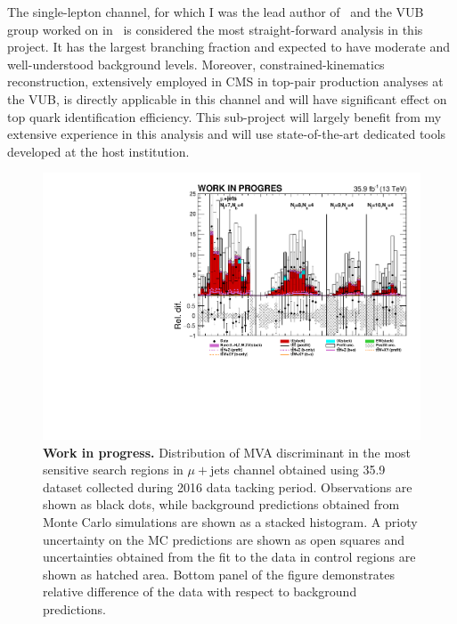 \textcolor{\mynew}{The single-lepton channel, for which I was the lead author of~\cite{CMS:2016wig} and the VUB group worked on in~\cite{Beck:2016hyi,Khachatryan:2014sca} is considered the most straight-forward analysis in this project. It has the largest branching fraction and expected to have moderate and well-understood background levels. Moreover, constrained-kinematics reconstruction, extensively employed in CMS in top-pair production analyses at the VUB, is directly applicable in this channel and will have significant effect on top quark identification efficiency. This sub-project will largely benefit from my extensive experience in this analysis and will use state-of-the-art dedicated tools developed at the host institution. \begin{figure}
\centering
\includegraphics[width=\linewidth]{figures/mu}
\caption{\textbf{Work in progress.} Distribution of MVA discriminant in the most sensitive search regions in $\mu+$jets channel obtained using 35.9 \invfb dataset collected during 2016 data tacking period. Observations are shown as black dots, while background predictions obtained from Monte Carlo simulations are shown as a stacked histogram. A prioty uncertainty on the MC predictions are shown as open squares and uncertainties obtained from the fit to the data in control regions are shown as hatched area. Bottom panel of the figure demonstrates relative difference of the data with respect to background predictions.}
\label{fig:mu}
\end{figure}
}
